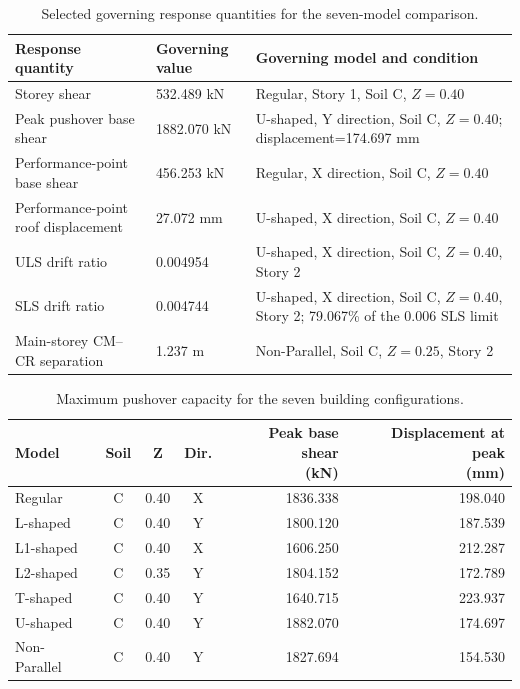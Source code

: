 \begin{table}[!htbp]
\caption[Governing response quantities for seven models]{Selected governing response quantities for the seven-model comparison.}
\label{tab:ch4_governing}
\centering
\begin{tabularx}{\textwidth}{@{}p{0.25\textwidth} p{0.18\textwidth} X@{}}
\toprule
\textbf{Response quantity} & \textbf{Governing value} & \textbf{Governing model and condition}\\
\midrule
Storey shear & 532.489 kN & Regular, Story 1, Soil C, $Z=0.40$\\
Peak pushover base shear & 1882.070 kN & U-shaped, Y direction, Soil C, $Z=0.40$; displacement=174.697 mm\\
Performance-point base shear & 456.253 kN & Regular, X direction, Soil C, $Z=0.40$\\
Performance-point roof displacement & 27.072 mm & U-shaped, X direction, Soil C, $Z=0.40$\\
ULS drift ratio & 0.004954 & U-shaped, X direction, Soil C, $Z=0.40$, Story 2\\
SLS drift ratio & 0.004744 & U-shaped, X direction, Soil C, $Z=0.40$, Story 2; 79.067\% of the 0.006 SLS limit\\
Main-storey CM--CR separation & 1.237 m & Non-Parallel, Soil C, $Z=0.25$, Story 2\\
\bottomrule
\end{tabularx}
\end{table}

\begin{table}[!htbp]
\caption{Maximum pushover capacity for the seven building configurations.}
\label{tab:ch4_peak_capacity}
\centering
\footnotesize
\setlength{\tabcolsep}{3pt}
\begin{adjustbox}{max width=\linewidth}
\begin{tabular}{@{}l c c c r r@{}}
\toprule
\textbf{Model} & \textbf{Soil} & \textbf{Z} & \textbf{Dir.} & \shortstack{\textbf{Peak base shear}\\\textbf{(kN)}} & \shortstack{\textbf{Displacement at peak}\\\textbf{(mm)}}\\
\midrule
Regular & C & 0.40 & X & 1836.338 & 198.040\\
L-shaped & C & 0.40 & Y & 1800.120 & 187.539\\
L1-shaped & C & 0.40 & X & 1606.250 & 212.287\\
L2-shaped & C & 0.35 & Y & 1804.152 & 172.789\\
T-shaped & C & 0.40 & Y & 1640.715 & 223.937\\
U-shaped & C & 0.40 & Y & 1882.070 & 174.697\\
Non-Parallel & C & 0.40 & Y & 1827.694 & 154.530\\
\bottomrule
\end{tabular}
\end{adjustbox}
\end{table}

